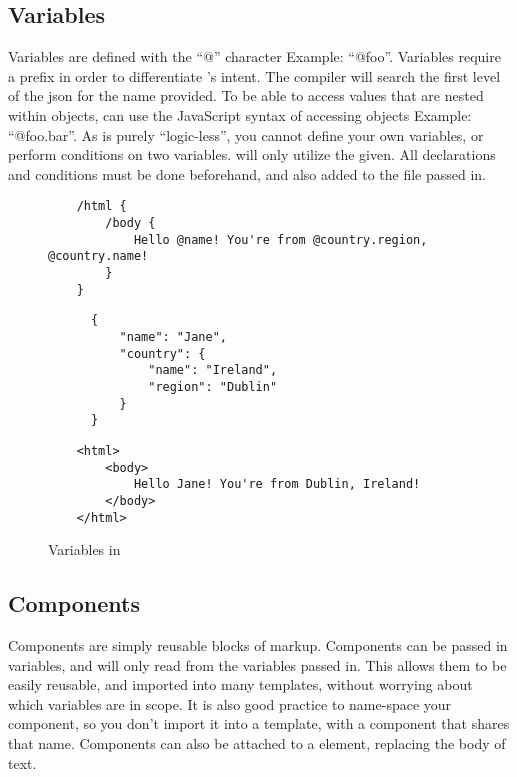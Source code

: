\newpage
\subsection{Variables}
Variables are defined with the ``@'' character Example: ``@foo''. Variables require a prefix in order to differentiate \you{}'s intent. The compiler will search the first level of the json for the name provided. To be able to access values that are nested within objects, \you{} can use the JavaScript syntax of accessing objects Example: ``@foo.bar''. As \languageName{} is purely ``logic-less'', you cannot define your own variables, or perform conditions on two variables. \languageName{} will only utilize the  given. All declarations and conditions must be done beforehand, and also added to the  file passed in.

\begin{figure}[!htbp]
    \Large{\textbf{\languageName{}}}\normalsize{}
  \begin{verbatim}
    /html {
        /body {
            Hello @name! You're from @country.region, @country.name!
        }
    }
  \end{verbatim}
    \Large{\textbf{}}\normalsize{}

  \begin{verbatim}
      {
          "name": "Jane",
          "country": {
              "name": "Ireland",
              "region": "Dublin"
          }
      }
  \end{verbatim}
    \Large{\textbf{}}\normalsize{}

  \begin{verbatim}
    <html>
        <body>
            Hello Jane! You're from Dublin, Ireland!
        </body>
    </html>
  \end{verbatim}
  \caption{Variables in \languageName{}}
\end{figure}
\newpage
\subsection{Components}
Components are simply reusable blocks of markup. Components can be passed in variables, and will only read from the variables passed in. This allows them to be easily reusable, and imported into many templates, without worrying about which variables are in scope. It is also good practice to name-space your component, so you don't import it into a template, with a component that shares that name. Components can also be attached to a element, replacing the body of text.

